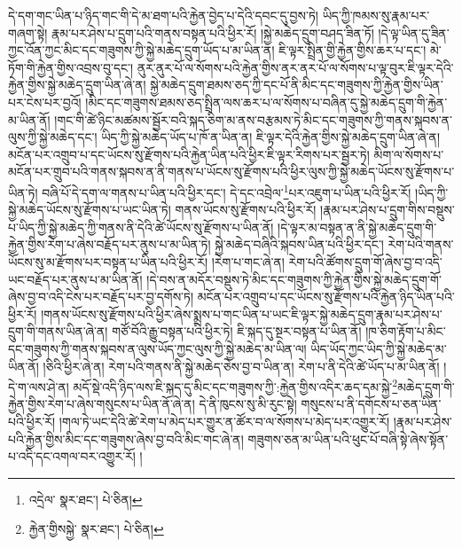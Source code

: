 དེ་དག་གང་ཡིན་པ་ཉིད་གང་གི་དེ་མ་ཐག་པའི་རྐྱེན་བྱེད་པ་དེའི་དབང་དུ་བྱས་ཏེ། ཡིད་ཀྱི་ཁམས་སུ་རྣམ་པར་གཞག་སྟེ། རྣམ་པར་ཤེས་པ་དྲུག་པའི་གནས་བསྟན་པའི་ཕྱིར་རོ། །སྐྱེ་མཆེད་དྲུག་བཤད་ཟིན་ཏོ། །དེ་ལྟ་ཡིན་དུ་ཟིན་ཀྱང་འོན་ཀྱང་མིང་དང་གཟུགས་ཀྱི་སྐྱེ་མཆེད་དྲུག་ཡོད་པ་མ་ཡིན་ན། ཇི་ལྟར་སྤྲིན་གྱི་རྐྱེན་གྱིས་ཆར་པ་དང་། མེ་ཏོག་གི་རྐྱེན་གྱིས་འབྲས་བུ་དང་། ནུར་ནུར་པོ་ལ་སོགས་པའི་རྐྱེན་གྱིས་ནར་ནར་པོ་ལ་སོགས་པ་ལྟ་བུར་ཇི་ལྟར་དེའི་རྐྱེན་གྱིས་སྐྱེ་མཆེད་དྲུག་ཡིན་ཞེ་ན། སྐྱེ་མཆེད་དྲུག་ཐམས་ཅད་ཀྱི་དང་པོ་ནི་མིང་དང་གཟུགས་ཀྱི་རྐྱེན་གྱིས་ཡིན་པར་ངེས་པར་བྱའོ། །མིང་དང་གཟུགས་ཐམས་ཅད་སྤྲིན་ལས་ཆར་པ་ལ་སོགས་པ་བཞིན་དུ་སྐྱེ་མཆེད་དྲུག་གི་རྐྱེན་མ་ཡིན་ནོ། །གང་གི་ཚེ་ཉིང་མཚམས་སྦྱོར་བའི་སྐད་ཅིག་མ་ནས་བརྩམས་ཏེ་མིང་དང་གཟུགས་ཀྱི་གནས་སྐབས་ན་ལུས་ཀྱི་སྐྱེ་མཆེད་དང་། ཡིད་ཀྱི་སྐྱེ་མཆེད་ཡོད་པ་ཁོ་ན་ཡིན་ན། ཇི་ལྟར་དེའི་རྐྱེན་གྱིས་སྐྱེ་མཆེད་དྲུག་ཡིན་ཞེ་ན། མངོན་པར་འགྲུབ་པ་དང་ཡོངས་སུ་རྫོགས་པའི་རྐྱེན་ཡིན་པའི་ཕྱིར་ཇི་ལྟར་རིགས་པར་སྦྱར་ཏེ། མིག་ལ་སོགས་པ་མངོན་པར་གྲུབ་པའི་གནས་སྐབས་ན་ནི་གནས་པ་ཡོངས་སུ་རྫོགས་པའི་ཕྱིར་ལུས་ཀྱི་སྐྱེ་མཆེད་ཡོངས་སུ་རྫོགས་པ་ཡིན་ཏེ། བཞི་པོ་དེ་དག་ལ་གནས་པ་ཡིན་པའི་ཕྱིར་དང་། དེ་དང་འབྲེལ་\footnote{འདྲེལ་  སྣར་ཐང་།  པེ་ཅིན། }པར་འཇུག་པ་ཡིན་པའི་ཕྱིར་རོ། །ཡིད་ཀྱི་སྐྱེ་མཆེད་ཡོངས་སུ་རྫོགས་པ་ཡང་ཡིན་ཏེ། གནས་ཡོངས་སུ་རྫོགས་པའི་ཕྱིར་རོ། །རྣམ་པར་ཤེས་པ་དྲུག་གིས་བསྡུས་པ་ཡིད་ཀྱི་སྐྱེ་མཆེད་ཀྱི་གནས་ནི་དེའི་ཚེ་ཡོངས་སུ་རྫོགས་པ་ཡིན་ནོ། །དེ་ལྟར་མ་བསྟན་ན་ནི་སྐྱེ་མཆེད་དྲུག་གི་རྐྱེན་གྱིས་རེག་པ་ཞེས་བརྗོད་པར་ནུས་པ་མ་ཡིན་ཏེ། སྐྱེ་མཆེད་བཞིའི་སྐབས་ཡིན་པའི་ཕྱིར་དང་། རེག་པའི་གནས་ཡོངས་སུ་མ་རྫོགས་པར་བསྟན་པ་ཡིན་པའི་ཕྱིར་རོ། །རེག་པ་གང་ཞེ་ན། རེག་པའི་ཚོགས་དྲུག་གོ་ཞེས་བྱ་བ་འདི་ཡང་བརྗོད་པར་ནུས་པ་མ་ཡིན་ནོ། །དེ་བས་ན་མདོར་བསྡུས་ཏེ་མིང་དང་གཟུགས་ཀྱི་རྐྱེན་གྱིས་སྐྱེ་མཆེད་དྲུག་གོ་ཞེས་བྱ་བ་འདི་ངེས་པར་བརྗོད་པར་བྱ་དགོས་ཏེ། མངོན་པར་འགྲུབ་པ་དང་ཡོངས་སུ་རྫོགས་པའི་རྐྱེན་ཉིད་ཡིན་པའི་ཕྱིར་རོ། །གནས་ཡོངས་སུ་རྫོགས་པའི་ཕྱིར་ཞེས་སྨྲས་པ་གང་ཡིན་པ་ཡང་ཇི་ལྟར་སྐྱེ་མཆེད་དྲུག་རྣམ་པར་ཤེས་པ་དྲུག་གི་གནས་ཡིན་ཞེ་ན། གཙོ་བོའི་རྒྱུ་བསྟན་པའི་ཕྱིར་ཏེ། ཇི་སྐད་དུ་སྔར་བསྟན་པ་ཡིན་ནོ། །ཁ་ཅིག་རྟོག་པ་མིང་དང་གཟུགས་ཀྱི་གནས་སྐབས་ན་ལུས་ཡོད་ཀྱང་ལུས་ཀྱི་སྐྱེ་མཆེད་མ་ཡིན་ལ། ཡིད་ཡོད་ཀྱང་ཡིད་ཀྱི་སྐྱེ་མཆེད་མ་ཡིན་ནོ། །ཅིའི་ཕྱིར་ཞེ་ན། རེག་པའི་གནས་ནི་སྐྱེ་མཆེད་ཅེས་བྱ་བ་ཡིན་ན། རེག་པ་ནི་དེའི་ཚེ་ཡོད་པ་མ་ཡིན་ནོ། །དེ་ག་ལས་ཤེ་ན། མདོ་སྡེ་འདི་ཉིད་ལས་ཇི་སྐད་དུ་མིང་དང་གཟུགས་ཀྱི་:རྐྱེན་གྱིས་འདིར་ཆད་དམ་སྐྱེ་\footnote{རྐྱེན་གྱིསསྐྱེ་  སྣར་ཐང་།  པེ་ཅིན། }མཆེད་དྲུག་གི་རྐྱེན་གྱིས་རེག་པ་ཞེས་གསུངས་པ་ཡིན་ནོ་ཞེ་ན། དེ་ནི་ཁུངས་སུ་མི་རུང་སྟེ། གསུངས་པ་ནི་དགོངས་པ་ཅན་ཡིན་པའི་ཕྱིར་རོ། །གལ་ཏེ་ཡང་དེའི་ཚེ་རེག་པ་མེད་པར་གྱུར་ན་ཚོར་བ་ལ་སོགས་པ་མེད་པར་འགྱུར་རོ། །རྣམ་པར་ཤེས་པའི་རྐྱེན་གྱིས་མིང་དང་གཟུགས་ཞེས་བྱ་བའི་མིང་གང་ཞེ་ན། གཟུགས་ཅན་མ་ཡིན་པའི་ཕུང་པོ་བཞི་སྟེ་ཞེས་སྟོན་པ་འདི་དང་འགལ་བར་འགྱུར་རོ། །
